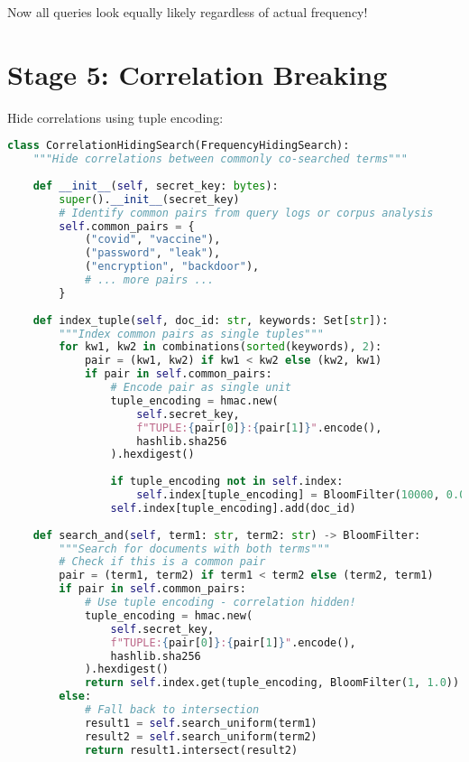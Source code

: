 Now all queries look equally likely regardless of actual frequency!

\section{Stage 5: Correlation Breaking}

Hide correlations using tuple encoding:

\begin{lstlisting}[language=Python, caption={Tuple encoding for correlation hiding}]
class CorrelationHidingSearch(FrequencyHidingSearch):
    """Hide correlations between commonly co-searched terms"""
    
    def __init__(self, secret_key: bytes):
        super().__init__(secret_key)
        # Identify common pairs from query logs or corpus analysis
        self.common_pairs = {
            ("covid", "vaccine"),
            ("password", "leak"),
            ("encryption", "backdoor"),
            # ... more pairs ...
        }
    
    def index_tuple(self, doc_id: str, keywords: Set[str]):
        """Index common pairs as single tuples"""
        for kw1, kw2 in combinations(sorted(keywords), 2):
            pair = (kw1, kw2) if kw1 < kw2 else (kw2, kw1)
            if pair in self.common_pairs:
                # Encode pair as single unit
                tuple_encoding = hmac.new(
                    self.secret_key,
                    f"TUPLE:{pair[0]}:{pair[1]}".encode(),
                    hashlib.sha256
                ).hexdigest()
                
                if tuple_encoding not in self.index:
                    self.index[tuple_encoding] = BloomFilter(10000, 0.001)
                self.index[tuple_encoding].add(doc_id)
    
    def search_and(self, term1: str, term2: str) -> BloomFilter:
        """Search for documents with both terms"""
        # Check if this is a common pair
        pair = (term1, term2) if term1 < term2 else (term2, term1)
        if pair in self.common_pairs:
            # Use tuple encoding - correlation hidden!
            tuple_encoding = hmac.new(
                self.secret_key,
                f"TUPLE:{pair[0]}:{pair[1]}".encode(),
                hashlib.sha256
            ).hexdigest()
            return self.index.get(tuple_encoding, BloomFilter(1, 1.0))
        else:
            # Fall back to intersection
            result1 = self.search_uniform(term1)
            result2 = self.search_uniform(term2)
            return result1.intersect(result2)
\end{lstlisting}

